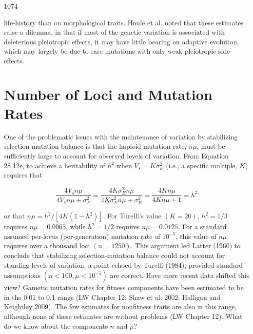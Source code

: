 \documentclass{article}
\begin{document}
1074

life-history than on morphological traits. Houle et al. noted that these estimates raise a dilemma, in that if most of the genetic variation is associated with deleterious pleiotropic effects, it may have little bearing on adaptive evolution, which may largely be due to rare mutations with only weak pleiotropic side effects.

\section{Number of Loci and Mutation Rates}
One of the problematic issues with the maintenance of variation by stabilizing selection-mutation balance is that the haploid mutation rate,  $ n\mu $, must be sufficiently large to account for observed levels of variation. From Equation 28.12e, to achieve a heritability of  $ h^2 $ when  $ V_s = K\sigma_E^2 $ (i.e., a specific multiple,  $ K $) requires that

\begin{equation}
\frac{4V_{s}n\mu}{4V_{s}n\mu+\sigma_{E}^{2}}=\frac{4K\sigma_{E}^{2}n\mu}{4K\sigma_{E}^{2}n\mu+\sigma_{E}^{2}}=\frac{4Kn\mu}{4Kn\mu+1}=h^{2}
\end{equation}

or that  $ n\mu = h^2 / [4K(1 - h^2)] $. For Turelli's value  $ (K = 20) $,  $ h^2 = 1/3 $ requires  $ n\mu = 0.0065 $, while  $ h^2 = 1/2 $ requires  $ n\mu = 0.0125 $. For a standard assumed per-locus (per-generation) mutation rate of  $ 10^{-5} $, this value of  $ n\mu $ requires over a thousand loci  $ (n = 1250) $. This argument led Latter (1960) to conclude that stabilizing selection-mutation balance could not account for standing levels of variation, a point echoed by Turelli (1984), provided standard assumptions  $ (n < 100, \mu < 10^{-5}) $ are correct. Have more recent data shifted this view? Gametic mutation rates for fitness components have been estimated to be in the 0.01 to 0.1 range (LW Chapter 12; Shaw et al. 2002; Halligan and Keightley 2009). The few estimates for nonfitness traits are also in this range, although none of these estimates are without problems (LW Chapter 12). What do we know about the components  $ n $ and  $ \mu $?
\end{document}
